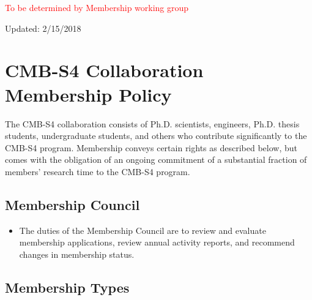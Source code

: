 
\textcolor{red}{To be determined by Membership working group}


Updated:  2/15/2018

\section{CMB-S4 Collaboration Membership Policy}

The CMB-S4 collaboration consists of Ph.D. scientists, engineers, Ph.D. thesis students, undergraduate students, and others who contribute significantly to the CMB-S4 program. Membership conveys certain rights as described below, but comes with the obligation of an ongoing commitment of a substantial fraction of members' research time to the CMB-S4 program.

\vspace{0.2in}
\noindent


\subsection{Membership Council}
\begin{itemize}

\item The duties of the Membership Council are to review and evaluate membership applications, review annual activity reports, and recommend changes in membership status. 
\end{itemize}

\subsection{Membership Types}

